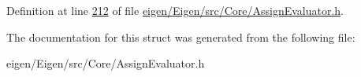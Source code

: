Definition at line \hyperlink{eigen_2_eigen_2src_2_core_2_assign_evaluator_8h_source_l00212}{212} of file \hyperlink{eigen_2_eigen_2src_2_core_2_assign_evaluator_8h_source}{eigen/\+Eigen/src/\+Core/\+Assign\+Evaluator.\+h}.



The documentation for this struct was generated from the following file\+:\begin{DoxyCompactItemize}
\item 
eigen/\+Eigen/src/\+Core/\+Assign\+Evaluator.\+h\end{DoxyCompactItemize}
